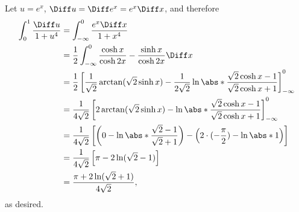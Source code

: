 \begin{enumerate}
          Let \(u = e^x\), \(\Diff u = \Diff e^x = e^x \Diff x\), and therefore
          \begin{align*}
              \int_{0}^{1} \frac{\Diff u}{1 + u^4} & = \int_{-\infty}^{0} \frac{e^x \Diff x}{1 + x^4}                                                                                                                      \\
                                                   & = \frac{1}{2} \int_{-\infty}^{0} \frac{\cosh x}{\cosh 2x} - \frac{\sinh x}{\cosh 2x} \Diff x                                                                          \\
                                                   & = \frac{1}{2} \left[\frac{1}{\sqrt{2}} \arctan(\sqrt{2} \sinh x) - \frac{1}{2\sqrt{2}} \ln\abs*{\frac{\sqrt{2}\cosh x - 1}{\sqrt{2}\cosh x + 1}}\right]_{-\infty}^{0} \\
                                                   & = \frac{1}{4\sqrt{2}} \left[2\arctan(\sqrt{2} \sinh x) - \ln\abs*{\frac{\sqrt{2}\cosh x - 1}{\sqrt{2}\cosh x + 1}}\right]_{-\infty}^{0}                               \\
                                                   & = \frac{1}{4\sqrt{2}} \left[\left(0 - \ln \abs*{\frac{\sqrt{2} - 1}{\sqrt{2} + 1}}\right) - \left(2 \cdot (-\frac{\pi}{2}) - \ln\abs*{1}\right)\right]                \\
                                                   & = \frac{1}{4\sqrt{2}} \left[\pi - 2\ln(\sqrt{2} - 1)\right]                                                                                                           \\
                                                   & = \frac{\pi + 2\ln(\sqrt{2} + 1)}{4\sqrt{2}},
          \end{align*}
          as desired.
\end{enumerate}